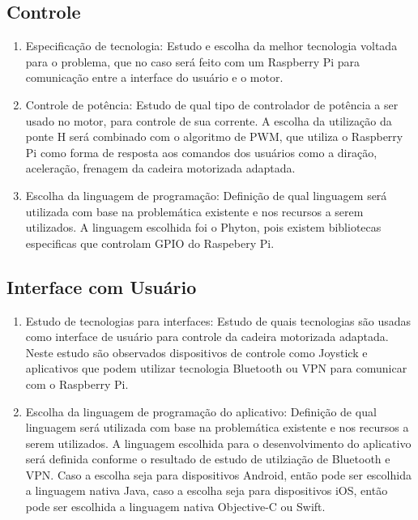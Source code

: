     \subsection{Controle}
      \begin{enumerate}
        \item Especificação de tecnologia: Estudo e escolha da melhor tecnologia voltada para o problema, que no caso será feito com um Raspberry Pi para comunicação entre a interface do usuário e o motor.

        \item Controle de potência: Estudo de qual tipo de controlador de potência a ser usado no motor, para controle de sua corrente. A escolha da utilização da ponte H será combinado com o algoritmo de PWM, que utiliza o Raspberry Pi como forma de resposta aos comandos dos usuários como a diração, aceleração, frenagem da cadeira motorizada adaptada.

        \item Escolha da linguagem de programação: Definição de qual linguagem será utilizada com base na problemática existente e nos recursos a serem utilizados. A linguagem escolhida foi o Phyton, pois existem bibliotecas especificas que controlam GPIO do Raspebery Pi.

      \end{enumerate}

  \subsection{Interface com Usuário}
    \begin{enumerate}
      \item Estudo de tecnologias para interfaces: Estudo de quais tecnologias são usadas como interface de usuário para controle da cadeira motorizada adaptada. Neste estudo são observados dispositivos de controle como Joystick e aplicativos que podem utilizar tecnologia Bluetooth ou VPN para comunicar com o Raspberry Pi.

      \item Escolha da linguagem de programação do aplicativo: Definição de qual linguagem será utilizada com base na problemática existente e nos recursos a serem utilizados. A linguagem escolhida para o desenvolvimento do aplicativo será definida conforme o resultado de estudo de utilziação de Bluetooth e VPN. Caso a escolha seja para dispositivos Android, então pode ser escolhida a linguagem nativa Java, caso a escolha seja para dispositivos iOS, então pode ser escolhida a linguagem nativa Objective-C ou Swift.

    \end{enumerate}


